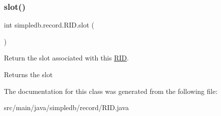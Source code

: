 \subsubsection{\texorpdfstring{slot()}{slot()}}
{\footnotesize\ttfamily int simpledb.\+record.\+R\+I\+D.\+slot (\begin{DoxyParamCaption}{ }\end{DoxyParamCaption})\hspace{0.3cm}{\ttfamily [inline]}}

Return the slot associated with this \hyperlink{classsimpledb_1_1record_1_1RID}{R\+ID}. \begin{DoxyReturn}{Returns}
the slot 
\end{DoxyReturn}


The documentation for this class was generated from the following file\+:\begin{DoxyCompactItemize}
\item 
src/main/java/simpledb/record/R\+I\+D.\+java\end{DoxyCompactItemize}
